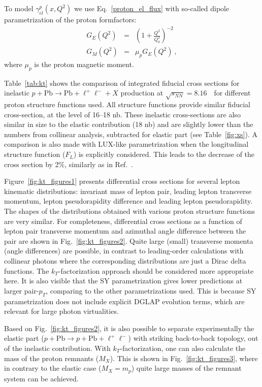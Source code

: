 To model $\gamma^{p}_{el}(x, Q^2)$ we use Eq.~\ref{proton_el_flux} with so-called dipole parametrization of the proton formfactors:
\begin{eqnarray}
G_E(Q^2) &=& \left( 1+\frac{Q^2}{Q_0^2} \right)^{-2} \\
G_M(Q^2) &=& \mu_p G_E(Q^2)~,
\end{eqnarray}
where $\mu_p$ is the proton magnetic moment.

Table~\ref{tab:kt} shows the comparison of integrated fiducial cross sections for inelastic $p+\textrm{Pb}\rightarrow \textrm{Pb} + \ell^+\ell^- + X$ production at $\sqrt{s_{N N}} = 8.16$~\TeV\ for different proton structure functions used.
All structure functions provide similar fiducial cross-section, at the level of 16--18 nb.
These inelastic cross-sections are also similar in size to the elastic contribution (18 nb) and are slightly lower than the numbers from collinear analysis, subtracted for elastic part (see Table~\ref{fig:xs}).
A comparison is also made with LUX-like parametrization when the longitudinal structure function ($F_L$) is explicitly considered.
This leads to the decrease of the cross section by 2\%, similarly as in Ref.~\cite{Luszczak:2018ntp}.

Figure~\ref{fig:kt_figures1} presents differential cross sections for several lepton kinematic distributions: invariant mass of lepton pair, leading lepton transverse momentum, lepton pseudorapidity difference and leading lepton pseudorapidity.
The shapes of the distributions obtained with various proton structure functions are very similar.
For completeness, differential cross sections as a function of lepton pair transverse momentum and azimuthal angle difference between the pair  are shown in Fig.~\ref{fig:kt_figures2}. Quite large (small) transverse momenta (angle differences) are possible, in contrast to leading-order calculations with collinear photons where the corresponding distributions are just a Dirac delta functions. 
The $k_T$-factorization approach should be considered more appropriate here. It is also visible that the SY parametrization gives lower predictions at larger pair-$p_T$, comparing to the other parametrizations used. This is because SY parametrization does not include explicit DGLAP evolution terms, which are relevant for large photon virtualities.

Based on Fig.~\ref{fig:kt_figures2}, it is also possible to separate experimentally the elastic part ($p+\textrm{Pb}\rightarrow p+ \textrm{Pb} + \ell^+\ell^-$) with striking back-to-back topology, out of the inelastic contribution.
With $k_T$-factorization, one can also calculate the mass of the proton remnants ($M_X$). This is shown in Fig.~\ref{fig:kt_figures3}, where in contrary to the elastic case ($M_X=m_p$) quite large masses of the remnant system can be achieved.



